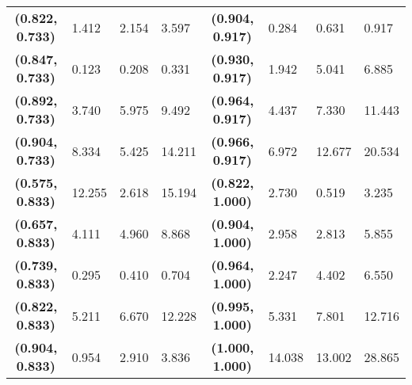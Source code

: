\begin{table}[h]
{\begin{tabular}{@{}clllc|lll@{}}
\textbf{(0.822, 0.733)}   & 1.412                 & 2.154                   & 3.597                   & \textbf{(0.904, 0.917)}   & 0.284                 & 0.631                   & 0.917                   \\
\textbf{(0.847, 0.733)}   & 0.123                 & 0.208                   & 0.331                   & \textbf{(0.930, 0.917)}   & 1.942                 & 5.041                   & 6.885                   \\
\textbf{(0.892, 0.733)}   & 3.740                 & 5.975                   & 9.492                   & \textbf{(0.964, 0.917)}   & 4.437                 & 7.330                   & 11.443                  \\
\textbf{(0.904, 0.733)}   & 8.334                 & 5.425                   & 14.211                  & \textbf{(0.966, 0.917)}   & 6.972                 & 12.677                  & 20.534                  \\
\textbf{(0.575, 0.833)}   & 12.255                & 2.618                   & 15.194                  & \textbf{(0.822, 1.000)}   & 2.730                 & 0.519                   & 3.235                   \\
\textbf{(0.657, 0.833)}   & 4.111                 & 4.960                   & 8.868                   & \textbf{(0.904, 1.000)}   & 2.958                 & 2.813                   & 5.855                   \\
\textbf{(0.739, 0.833)}   & 0.295                 & 0.410                   & 0.704                   & \textbf{(0.964, 1.000)}   & 2.247                 & 4.402                   & 6.550                   \\
\textbf{(0.822, 0.833)}   & 5.211                 & 6.670                   & 12.228                  & \textbf{(0.995, 1.000)}   & 5.331                 & 7.801                   & 12.716                  \\
\textbf{(0.904, 0.833)}   & 0.954                 & 2.910                   & 3.836                   & \textbf{(1.000, 1.000)}   & 14.038                & 13.002                  & 28.865                  \\ \bottomrule
\end{tabular}%
}
\end{table}
